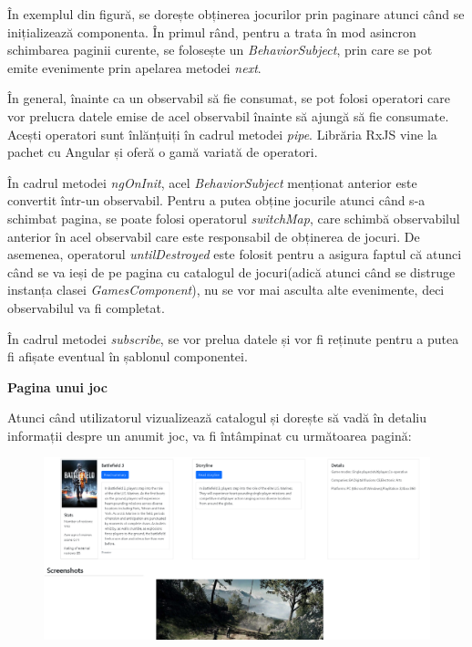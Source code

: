 \documentclass[12pt,a4paper]{report}
\begin{document}
În exemplul din figură, se dorește obținerea jocurilor prin paginare atunci când se inițializează componenta. În primul rând, pentru a trata în mod asincron schimbarea paginii curente, se folosește un \emph{BehaviorSubject}, prin care se pot emite evenimente prin apelarea metodei \emph{next}.

În general, înainte ca un observabil să fie consumat, se pot folosi operatori care vor prelucra datele emise de acel observabil înainte să ajungă să fie consumate. Acești operatori sunt înlănțuiți în cadrul metodei \emph{pipe}. Librăria RxJS \cite{35} vine la pachet cu Angular și oferă o gamă variată de operatori.

În cadrul metodei \emph{ngOnInit}, acel \emph{BehaviorSubject} menționat anterior este convertit într-un observabil. Pentru a putea obține jocurile atunci când s-a schimbat pagina, se poate folosi operatorul \emph{switchMap}, care schimbă observabilul anterior în acel observabil care este responsabil de obținerea de jocuri. De asemenea, operatorul \emph{untilDestroyed} este folosit pentru a asigura faptul că atunci când se va ieși de pe pagina cu catalogul de jocuri(adică atunci când se distruge instanța clasei \emph{GamesComponent}), nu se vor mai asculta alte evenimente, deci observabilul va fi completat.

În cadrul metodei \emph{subscribe}, se vor prelua datele și vor fi reținute pentru a putea fi afișate eventual în șablonul componentei.

\bigskip
\textbf{Pagina unui joc}
\bigskip

Atunci când utilizatorul vizualizează catalogul și dorește să vadă în detaliu informații despre un anumit joc, va fi întâmpinat cu următoarea pagină:

\begin{figure}[H]
\centering
\caption{}
\begin{adjustbox}{max size={\textwidth}{\textheight}}
\includegraphics{exemplu_34_game_details}
\end{adjustbox}

\caption*{}
\end{figure}
\end{document}
